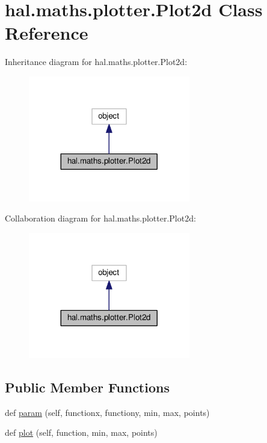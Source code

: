 \hypertarget{classhal_1_1maths_1_1plotter_1_1_plot2d}{}\section{hal.\+maths.\+plotter.\+Plot2d Class Reference}
\label{classhal_1_1maths_1_1plotter_1_1_plot2d}


Inheritance diagram for hal.\+maths.\+plotter.\+Plot2d\+:
\nopagebreak
\begin{figure}[H]
\begin{center}
\leavevmode
\includegraphics[width=200pt]{classhal_1_1maths_1_1plotter_1_1_plot2d__inherit__graph}
\end{center}
\end{figure}


Collaboration diagram for hal.\+maths.\+plotter.\+Plot2d\+:
\nopagebreak
\begin{figure}[H]
\begin{center}
\leavevmode
\includegraphics[width=200pt]{classhal_1_1maths_1_1plotter_1_1_plot2d__coll__graph}
\end{center}
\end{figure}
\subsection*{Public Member Functions}
\begin{DoxyCompactItemize}
\item 
def \hyperlink{classhal_1_1maths_1_1plotter_1_1_plot2d_a60f7295d6cad1639e30c6b0407a2b983}{param} (self, functionx, functiony, min, max, points)
\item 
def \hyperlink{classhal_1_1maths_1_1plotter_1_1_plot2d_aa340a489f84fc82aa7c69a868ebd11c3}{plot} (self, function, min, max, points)
\end{DoxyCompactItemize}

